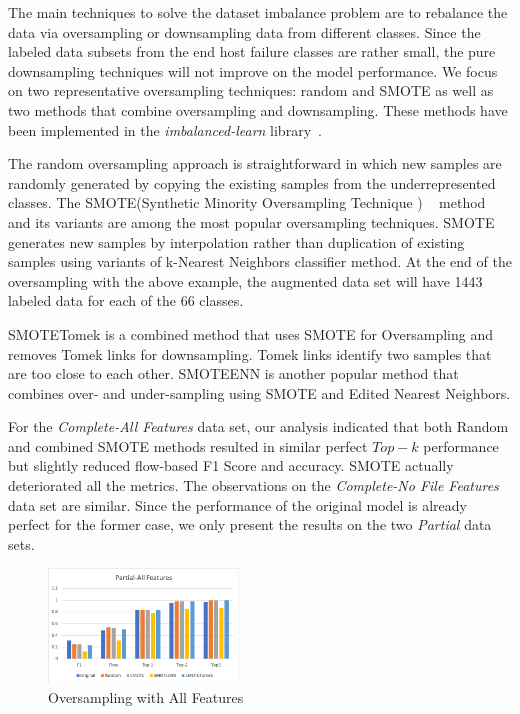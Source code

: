 The main techniques to solve the dataset imbalance problem are to rebalance the data via oversampling or downsampling data from different classes. Since the labeled data subsets from the end host failure classes are rather small, the pure downsampling techniques will not improve on the model performance. We focus on two representative oversampling techniques: random and SMOTE as well as two methods that combine oversampling and downsampling.
These methods have been implemented in the {\it imbalanced-learn} library~\cite{imbalance-learn:web}.

The random oversampling approach is straightforward in which new samples are randomly generated by copying the existing samples from the underrepresented classes. The SMOTE(Synthetic Minority Oversampling Technique ) ~\cite{smote:2002} method and its variants are among the most popular oversampling techniques. SMOTE generates new samples by interpolation rather than duplication of existing samples using variants of k-Nearest Neighbors classifier method. At the end of the oversampling with the above example, the augmented data set will have 1443 labeled data for each of the 66 classes. 

SMOTETomek is a combined method that uses SMOTE for Oversampling and removes Tomek links for downsampling. Tomek links identify two samples that are too close to each other. SMOTEENN is another popular method that combines over- and under-sampling using SMOTE and Edited Nearest Neighbors.

For the  {\it Complete-All Features} data set, our analysis indicated that both Random and combined SMOTE methods resulted in similar perfect $Top-k$ performance but slightly reduced flow-based F1 Score and accuracy. SMOTE actually deteriorated all the metrics. The observations on the  {\it Complete-No File Features} data set are similar. Since the performance of the original model is already perfect for the former case, we only present the results on the two {\it Partial} data sets.


\begin{figure}[!ht]
\begin{center}
\includegraphics[width=0.45\textwidth]{./figure/partial-all-oversampling}
\end{center}
\caption{Oversampling with All Features}
\label{fig:dt}
\end{figure}

